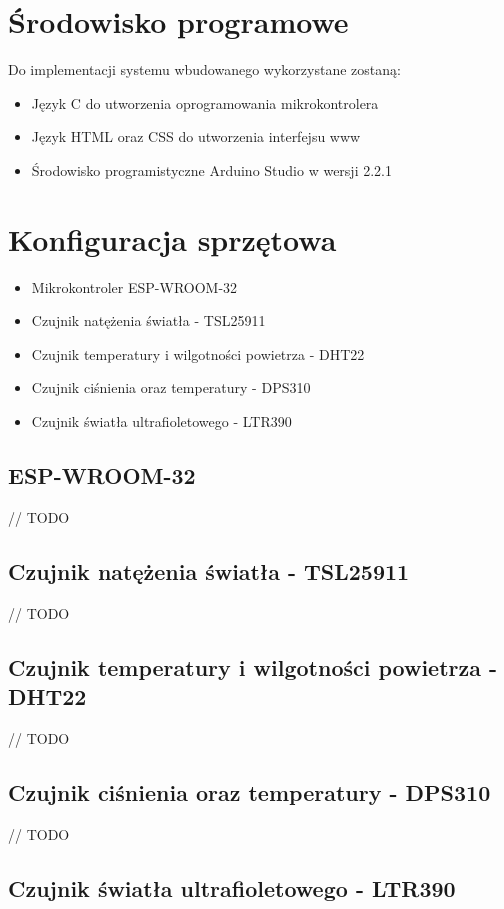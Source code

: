 \documentclass[12pt,a4paper]{article}
\begin{document}
\section{Środowisko programowe}
Do implementacji systemu wbudowanego wykorzystane zostaną:
\begin{itemize}
    \item Język C do utworzenia oprogramowania mikrokontrolera
    \item Język HTML oraz CSS do utworzenia interfejsu www
    \item Środowisko programistyczne Arduino Studio w wersji 2.2.1
\end{itemize}

\section{Konfiguracja sprzętowa}

\begin{itemize}
    \item Mikrokontroler ESP-WROOM-32
    \item Czujnik natężenia światła - TSL25911
    \item Czujnik temperatury i wilgotności powietrza - DHT22
    \item Czujnik ciśnienia oraz temperatury - DPS310
    \item Czujnik światła ultrafioletowego - LTR390
\end{itemize}

\subsection{ESP-WROOM-32}
// TODO

\subsection{Czujnik natężenia światła - TSL25911}
// TODO

\subsection{Czujnik temperatury i wilgotności powietrza - DHT22}
// TODO

\subsection{Czujnik ciśnienia oraz temperatury - DPS310}
// TODO

\subsection{Czujnik światła ultrafioletowego - LTR390}
\end{document}

